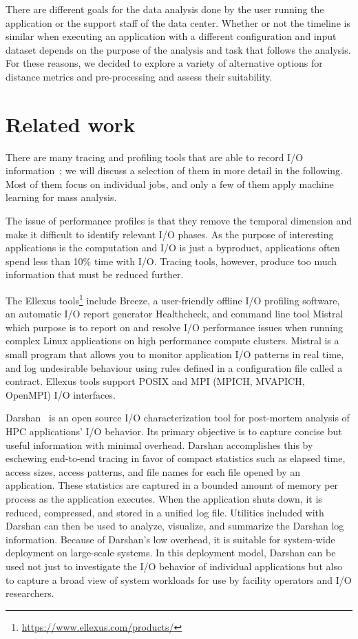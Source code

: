 \documentclass[]{llncs}
\begin{document}
There are different goals for the data analysis done by the user running the application or the support staff of the data center.
Whether or not the timeline is similar when executing an application with a different configuration and input dataset depends on the purpose of the analysis and task that follows the analysis.
For these reasons, we decided to explore a variety of alternative options for distance metrics and pre-processing and assess their suitability.


\section{Related work}
There are many tracing and profiling tools that are able to record I/O information~\cite{TFAPIKBBCF19}; we will discuss a selection of them in more detail in the following.
Most of them focus on individual jobs, and only a few of them apply machine learning for mass analysis.

The issue of performance profiles is that they remove the temporal dimension and make it difficult to identify relevant I/O phases.
As the purpose of interesting applications is the computation and I/O is just a byproduct, applications often spend less than 10\% time with I/O.
Tracing tools, however, produce too much information that must be reduced further.

The Ellexus tools\footnote{\url{https://www.ellexus.com/products/}} include Breeze, a user-friendly offline I/O profiling software, an automatic I/O report generator Healthcheck, and command line tool Mistral which purpose is to report on and resolve I/O performance issues when running complex Linux applications on high performance compute clusters.
Mistral is a small program that allows you to monitor application I/O patterns in real time, and log undesirable behaviour using rules defined in a configuration file called a contract.
Ellexus tools support POSIX and MPI (MPICH, MVAPICH, OpenMPI) I/O interfaces.

Darshan~\cite{carns2011understanding-toc,hpcdarshan} is an open source I/O characterization tool for post-mortem analysis of HPC applications' I/O behavior.
Its primary objective is to capture concise but useful information with minimal overhead.
Darshan accomplishes this by eschewing end-to-end tracing in favor of compact statistics such as elapsed time, access sizes, access patterns, and file names for each file opened by an application.
These statistics are captured in a bounded amount of memory per process as the application executes.
When the application shuts down, it is reduced, compressed, and stored in a unified log file.
Utilities included with Darshan can then be used to analyze, visualize, and summarize the Darshan log information.
Because of Darshan's low overhead, it is suitable for system-wide deployment on large-scale systems.
In this deployment model, Darshan can be used not just to investigate the I/O behavior of individual applications but also to capture a broad view of system workloads for use by facility operators and I/O researchers.
\end{document}
